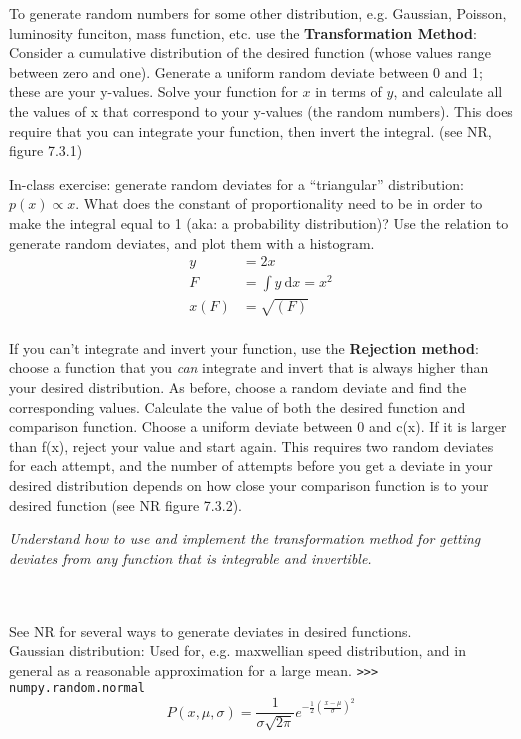 \documentclass[12pt]{article}
\begin{document}
To generate random numbers for some other distribution, e.g. Gaussian, Poisson,
luminosity funciton, mass function, etc. use the \textbf{Transformation Method}:
Consider a cumulative distribution of the desired function (whose values range
between zero and one). Generate a uniform random deviate between 0 and 1; these
are your y-values. Solve your function for $x$ in terms of $y$, and calculate
all the values of x that correspond to your y-values (the random numbers). This
does require that you can integrate your function, then invert the integral.
(see NR, figure 7.3.1)

In-class exercise: generate random deviates for a ``triangular'' distribution:
$p(x) \propto x$. What does the constant of proportionality need to be in order
to make the integral equal to 1 (aka: a probability distribution)? Use the
relation to generate random deviates, and plot them with a histogram.
\begin{align*}
    y &= 2x \\
    F &= \int \! y \ \mathrm{d}x = x^2\\
    x(F) &= \sqrt{(F)} \\
\end{align*}

If you can't integrate and invert your function, use the \textbf{Rejection
method}: choose a function that you \emph{can} integrate and invert that is
always higher than your desired distribution. As before, choose a random deviate
and find the corresponding values. Calculate the value of both
the desired function and comparison function. Choose a uniform deviate between
0 and c(x). If it is larger than f(x), reject your value and start again.
This requires two random deviates for each attempt, and the number of attempts
before you get a deviate in your desired distribution depends on how close your
comparison function is to your desired function (see NR figure 7.3.2). \\

\colorbox{hl}{\parbox{0.9\textwidth}
{\emph{Understand how to use and implement the transformation method for
getting deviates from any function that is integrable and invertible.}}}
\\\\ See NR for several ways to generate deviates in desired functions. \\

Gaussian distribution:
Used for, e.g. maxwellian speed distribution, and in general as a
reasonable approximation for a large mean.
\texttt{>>> numpy.random.normal}
\begin{equation*}
    P(x,\mu,\sigma) = \frac{1}{\sigma\sqrt{2\pi}}
    e^{-\frac{1}{2}(\frac{x-\mu}{\sigma})^2   }
\end{equation*}
\end{document}
